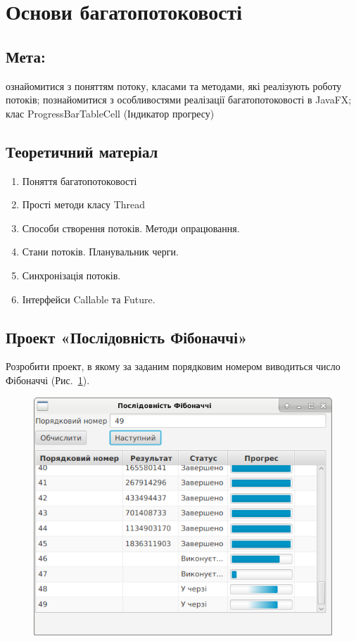 \section{Основи багатопотоковості}

\subsection{Мета:}
ознайомитися з поняттям потоку, класами та методами, які реалізують роботу потоків;
познайомитися з особливостями реалізації багатопотоковості в JavaFX; клас ProgressBarTableCell (Індикатор прогресу)

\subsection{Теоретичний матеріал}

\begin{enumerate}
	\item Поняття багатопотоковості
	\item Прості методи класу Thread
	\item Способи створення потоків. Методи опрацювання.
	\item Стани потоків. Планувальник черги.
	\item Синхронізація потоків.
	\item Інтерфейси Callable та Future.
\end{enumerate}

\subsection{Проект «Послідовність Фібоначчі»}

Розробити проект, в якому за заданим порядковим номером виводиться число Фібоначчі (Рис.~\ref{fig:image1}).

\begin{figure}[h]
	\includegraphics{chapter21/images/image1.png}
	\caption{}
	\label{fig:image1}
\end{figure}

